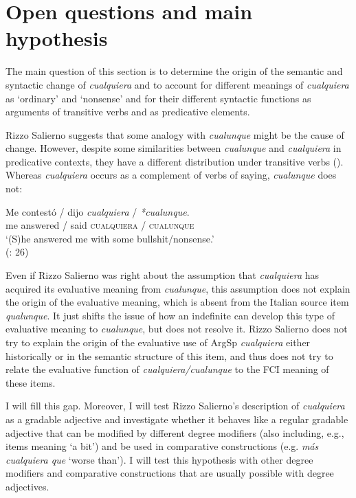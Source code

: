 \section{{Open} {questions} {and} {main} {hypothesis}} \label{sec:4.2}

The main question of this section is to determine the origin of the semantic and syntactic change of \textit{cualquiera} and to account for different meanings of \textit{cualquiera} as ‘ordinary’ and ‘nonsense’ and for their different syntactic functions as arguments of transitive verbs and as predicative elements.

Rizzo Salierno suggests that some analogy with \textit{cualunque} might be the cause of change. However, despite some similarities between \textit{cualunque} and \textit{cualquiera} in predicative contexts, they have a different distribution under transitive verbs (\citealt{Kellert-francia-2023}). Whereas \textit{cualquiera} occurs as a complement of verbs of saying, \textit{cualunque} does not:

\ea \label{ex:key:191} %
    \gll Me {contestó} / {dijo} \textit{cualquiera} / \textit{*cualunque}.\\
    me {answered} / {said} \textsc{cualquiera} / \textsc{cualunque}\\
    \glt ‘(S)he answered me with some bullshit/nonsense.’\\
    (\citealt{Rizzosalierno2013}: 26)
\z

Even if Rizzo Salierno was right about the assumption that \textit{cualquiera} has acquired its evaluative meaning from \textit{cualunque}, this assumption does not explain the origin of the evaluative meaning, which is absent from the Italian source item \textit{qualunque}. It just shifts the issue of how an indefinite can develop this type of evaluative meaning to \textit{cualunque}, but does not resolve it. Rizzo Salierno does not try to explain the origin of the evaluative use of ArgSp \textit{cualquiera} either historically or in the semantic structure of this item, and thus does not try to relate the evaluative function of \textit{cualquiera/cualunque} to the FCI meaning of these items.

I will fill this gap. Moreover, I will test Rizzo Salierno’s description of \textit{cualquiera} as a gradable adjective and investigate whether it behaves like a regular gradable adjective that can be modified by different degree modifiers (also including, e.g., items meaning ‘a bit’) and be used in comparative constructions (e.g. \textit{más cualquiera que} ‘worse than’). I will test this hypothesis with other degree modifiers and comparative constructions that are usually possible with degree adjectives.

